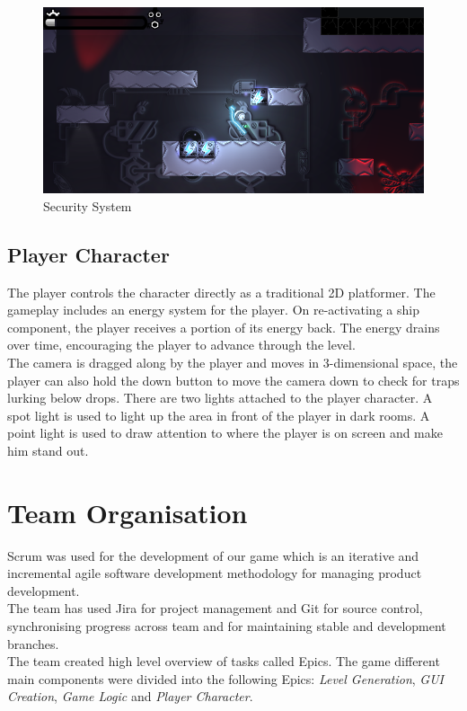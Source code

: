 \documentclass[11pt]{article}
\begin{document}
\begin{figure}
\centering
\includegraphics[width=\linewidth]{securitysystem.png}
\caption{Security System}\label{Fig:Data5}
\end{figure}
\subsection{Player Character}
The player controls the character directly as a traditional 2D platformer. The gameplay includes an energy system for the player. On re-activating a ship component, the player receives a portion of its energy back. The energy drains over time, encouraging the player to advance through the level.\\

The camera is dragged along by the player and moves in 3-dimensional space, the player can also hold the down button to move the camera down to check for traps lurking below drops. There are two lights attached to the player character. A spot light is used to light up the area in front of the player in dark rooms. A point light is used to draw attention to where the player is on screen and make him stand out.
\section{Team Organisation}
Scrum was used for the development of our game which is an iterative and incremental agile software development methodology for managing product development.\\

The team has used Jira for project management and Git for source control, synchronising progress across team and for maintaining stable and development branches.\\

The team created high level overview of tasks called Epics. The game different main components were divided into the following Epics: \textit{Level Generation}, \textit{GUI Creation}, \textit{Game Logic} and \textit{Player Character}.\\
\end{document}
